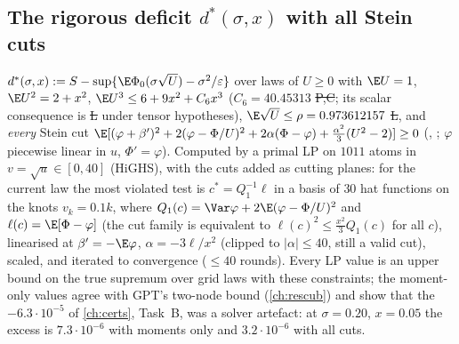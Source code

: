 \subsection{The rigorous deficit $d^*(\sigma,x)$ with all Stein cuts}\label{sec:ab-dstar}
$d^*(\sigma,x):=S-\sup\{\E\Phi_0(\sigma\sqrt U)-\sigma^2/\varepsilon\}$ over laws of $U\ge0$ with $\E U=1$, $\E U^2=2+x^2$, $\E U^3\le6+9x^2+C_6x^3$ ($C_6=40.45313$ \st{P,C}; its scalar consequence is \st{L} under tensor hypotheses),
$\E\sqrt U\le\rho=0.973612157$ \st{L}, and \emph{every} Stein cut
$\E[(\varphi+\beta')^2+2(\varphi-\Phi/U)^2+2\alpha(\Phi-\varphi)+\tfrac{\alpha^2}3(U^2-2)]\ge0$ (, ; $\varphi$ piecewise linear in $u$,
$\Phi'=\varphi$). Computed by a primal LP on $1011$ atoms in $v=\sqrt u\in[0,40]$ (HiGHS), with the cuts added as cutting planes: for the current law the most violated test is
$c^*=Q_1^{-1}\ell$ in a basis of $30$ hat functions on the knots $v_k=0.1k$, where $Q_1(c)=\Var\varphi+2\E(\varphi-\Phi/U)^2$ and $\ell(c)=\E[\Phi-\varphi]$ (the cut family is
equivalent to $\ell(c)^2\le\tfrac{x^2}3Q_1(c)$ for all $c$), linearised at $\beta'=-\E\varphi$, $\alpha=-3\ell/x^2$ (clipped to $|\alpha|\le40$, still a valid cut), scaled, and
iterated to convergence ($\le40$ rounds). Every LP value is an upper bound on the true supremum over grid laws with these constraints; the moment-only values agree with GPT's
two-node bound (\autoref{ch:rescub}) and show that the $-6.3\cdot10^{-5}$ of \autoref{ch:certs}, Task~B, was a solver artefact: at $\sigma=0.20$, $x=0.05$ the excess is
$7.3\cdot10^{-6}$ with moments only and $3.2\cdot10^{-6}$ with all cuts.
